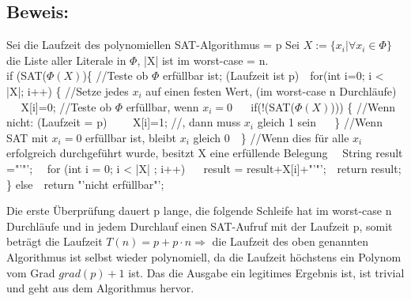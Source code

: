 \documentclass[a4paper,11pt,twoside]{article}
\begin{document}
\subsection*{Beweis:}
Sei die Laufzeit des polynomiellen SAT-Algorithmus = p
Sei $X:=\{x_i| \forall x_i \in \Phi\}$ die Liste aller Literale in $\Phi$, |X| ist im worst-case = n.\\
if (SAT($\Phi(X)$)\{  //Teste ob $\Phi$ erfüllbar ist; (Laufzeit ist p) 
$~~~$for(int i=0; i < |X|; i++) \{  //Setze jedes $x_i$ auf einen festen Wert, (im worst-case n Durchläufe)
$~~~$$~~~$X[i]=0;  //Teste ob $\Phi$ erfüllbar, wenn $x_i=0$
$~~~$$~~~$if(!(SAT($\Phi(X)$))) \{ //Wenn nicht: (Laufzeit = p)
$~~~$$~~~$$~~~$X[i]=1; 	//, dann muss $x_i$ gleich 1 sein
$~~~$$~~~$\} //Wenn SAT mit $x_i=0$ erfüllbar ist, bleibt $x_i$ gleich 0 
$~~~$\} //Wenn dies für alle $x_i$ erfolgreich durchgeführt wurde, besitzt X eine erfüllende Belegung
$~~~$ String result ="'"';
$~~~$ for (int i = 0; i < |X| ; i++)
$~~~$$~~~$result = result+X[i]+"'"';
$~~~$return result;
\}
else
$~~~$return "'nicht erfüllbar"';

Die erste Überprüfung dauert p lange, die folgende Schleife hat im worst-case n Durchläufe und in jedem Durchlauf einen SAT-Aufruf mit der Laufzeit p, somit beträgt die Laufzeit $T(n)=p+p\cdot n \Rightarrow$ die Laufzeit des oben genannten Algorithmus ist selbst wieder polynomiell, da die Laufzeit höchstens ein Polynom vom Grad $grad(p)+1$ ist. Das die Ausgabe ein legitimes Ergebnis ist, ist trivial und geht aus dem Algorithmus hervor.
\end{document}
